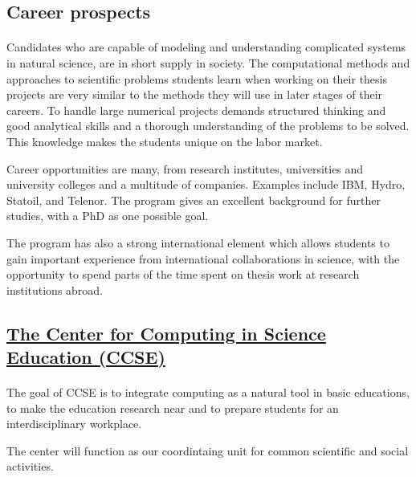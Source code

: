 \documentclass[%
oneside,                 %
final,                   %
10pt]{article}
\begin{document}
\noindent



\subsection{Career prospects}


\paragraph{}
Candidates who are capable of modeling and understanding complicated
systems in natural science, are in short supply in society.  The
computational methods and approaches to scientific problems students learn
when working on their thesis projects are very similar to the methods
they will use in later stages of their careers.  To handle large
numerical projects demands structured thinking and good analytical
skills and a thorough understanding of the problems to be solved. This
knowledge makes the students unique on the labor market.

Career opportunities are many, from research institutes, universities
and university colleges and a multitude of companies. Examples
include IBM, Hydro, Statoil, and Telenor.  The program gives an
excellent background for further studies, with a PhD as one possible
goal.

The program has also a strong international element which allows students to
gain important experience from international collaborations in
science, with the opportunity to spend parts of the time spent on
thesis work at research institutions abroad.



\subsection{\href{{https://www.mn.uio.no/ccse/english/}}{The Center for Computing in Science Education (CCSE)}}


\paragraph{}
The goal of CCSE is to integrate computing as a natural tool in basic educations, to make the education research near and to prepare students for an interdisciplinary workplace.

The center will function as our coordintaing unit for common scientific and social activities. 
\end{document}

